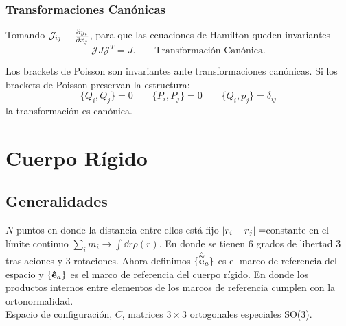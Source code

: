 \subsection{Transformaciones Canónicas}
Tomando $\mathcal{J} _{ij} \equiv \pdv{y_i}{x_j}$, para que las ecuaciones de Hamilton queden invariantes
	\begin{equation}
		\boxed{ \mathcal{J} J \mathcal{J} ^T = J.} \qquad \text{Transformación Canónica.}
	\end{equation}

\begin{teorema}
	Los brackets de Poisson son invariantes ante transformaciones canónicas. Si los brackets de Poisson preservan la estructura:
	\begin{equation}
		\{ Q_i,Q_j \} = 0 \qquad \{ P_i,P_j \} = 0 \qquad \{ Q_i,p_j \} = \delta _{ij}
	\end{equation}
	la transformación es canónica.
\end{teorema}
















\chapter{Cuerpo Rígido}
\section{Generalidades}
$N$ puntos en donde la distancia entre ellos está fijo $\abs{r_i - r_j} = $constante en el límite continuo $\sum _i m_i \to \int \dd{r} \rho (r)$. En donde se tienen $6$ grados de libertad $3$ traslaciones y $3$ rotaciones. Ahora definimos $\{ \vu{\overset{\sim}{e}}_a \}$ es el marco de referencia del espacio y $\{ \vu{e}_a \}$ es el marco de referencia del cuerpo rígido. En donde los productos internos entre elementos de los marcos de referencia cumplen con la ortonormalidad. \\

Espacio de configuración, $C$, matrices $3\times 3$ ortogonales especiales SO($3$).

